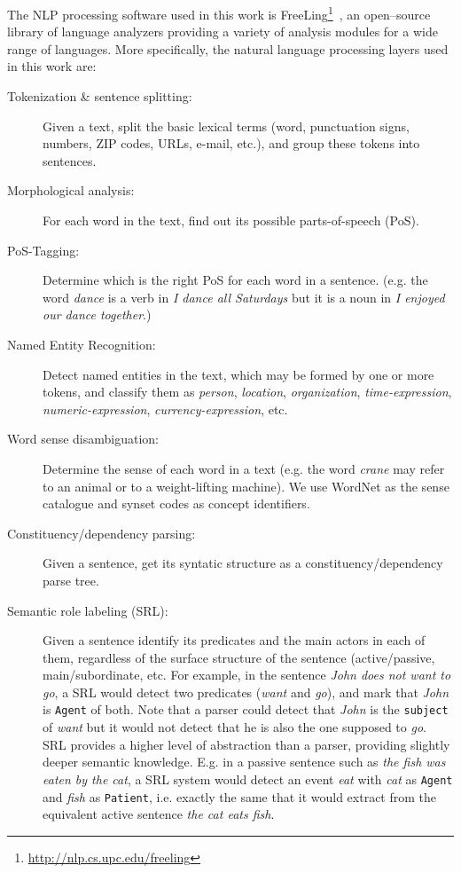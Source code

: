  The NLP processing software used in this work is
 FreeLing\footnote{\url{http://nlp.cs.upc.edu/freeling}}~\cite{PadroS12}, an
 open--source library of language analyzers providing a variety of analysis
 modules for a wide range of languages. More specifically, the natural language
 processing layers used in this work are:
 
\begin{description}
\item[Tokenization \& sentence splitting:] Given a text, split the basic lexical
  terms (word, punctuation signs, numbers, ZIP codes, URLs, e-mail, etc.), and
  group these tokens into sentences.
\item[Morphological analysis:] For each word in the text, find out its possible
  parts-of-speech (PoS).
\item[PoS-Tagging:] Determine which is the right PoS for each word in a
  sentence. (e.g. the word \textit{dance} is a verb in \textit{I dance all
    Saturdays} but it is a noun in \textit{I enjoyed our dance together}.)
\item[Named Entity Recognition:] Detect named entities in the text, which may be
  formed by one or more tokens, and classify them as \textit{person},
  \textit{location}, \textit{organization}, \textit{time-expression},
  \textit{numeric-expression}, \textit{currency-expression}, etc.
\item[Word sense disambiguation:] Determine the sense of each word in a text
  (e.g. the word \textit{crane} may refer to an animal or to a weight-lifting
  machine). We use WordNet \cite{fellbaum98} as the sense catalogue and synset
  codes as concept identifiers.
\item[Constituency/dependency parsing:] Given a sentence, get its syntatic
  structure as a constituency/dependency parse tree.
\item[Semantic role labeling (SRL):] Given a sentence identify its predicates and the
  main actors in each of them, regardless of the surface structure of the
  sentence (active/passive, main/subordinate, etc. For example, in the sentence
  \textit{John does not want to go}, a SRL would detect two predicates
  (\textit{want} and \textit{go}), and mark that \textit{John} is \texttt{Agent}
  of both. Note that a parser could detect that \textit{John} is the
  \texttt{subject} of \textit{want} but it would not detect that he is also the
  one supposed to \textit{go}.  SRL provides a higher level of abstraction than
  a parser, providing slightly deeper semantic knowledge. E.g. in a passive
  sentence such as \textit{the fish was eaten by the cat}, a SRL system would
  detect an event \textit{eat} with \textit{cat} as \texttt{Agent} and
  \textit{fish} as \texttt{Patient}, i.e. exactly the same that it would extract
  from the equivalent active sentence \textit{the cat eats fish}.
  


\end{description}
